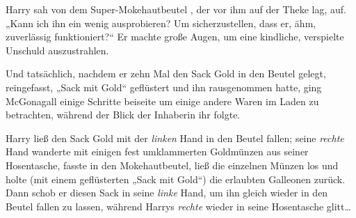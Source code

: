 Harry sah von dem Super-Mokehautbeutel , der vor ihm auf der Theke lag, auf. „Kann ich ihn ein wenig ausprobieren? Um sicherzustellen, dass er, ähm, zuverlässig funktioniert?“ Er machte große Augen, um eine kindliche, verspielte Unschuld auszustrahlen.

Und tatsächlich, nachdem er zehn Mal den Sack Gold in den Beutel gelegt, reingefasst, „Sack mit Gold“ geflüstert und ihn rausgenommen hatte, ging McGonagall einige Schritte beiseite um einige andere Waren im Laden zu betrachten, während der Blick der Inhaberin ihr folgte.

Harry ließ den Sack Gold mit der \emph{linken} Hand in den Beutel fallen; seine \emph{rechte} Hand wanderte mit einigen fest umklammerten Goldmünzen aus seiner Hosentasche, fasste in den Mokehautbeutel, ließ die einzelnen Münzen los und holte (mit einem geflüsterten „Sack mit Gold“) die erlaubten Galleonen zurück. Dann schob er diesen Sack in seine \emph{linke} Hand, um ihn gleich wieder in den Beutel fallen zu lassen, während Harrys \emph{rechte} wieder in seine Hosentasche glitt…


